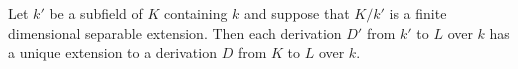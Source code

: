 Let $k'$ be a subfield of $K$ containing $k$ and suppose that $K/k'$ is a finite dimensional separable extension. Then each derivation $D'$ from $k'$ to $L$ over $k$ has a unique extension to a derivation $D$ from $K$ to $L$ over $k$.
